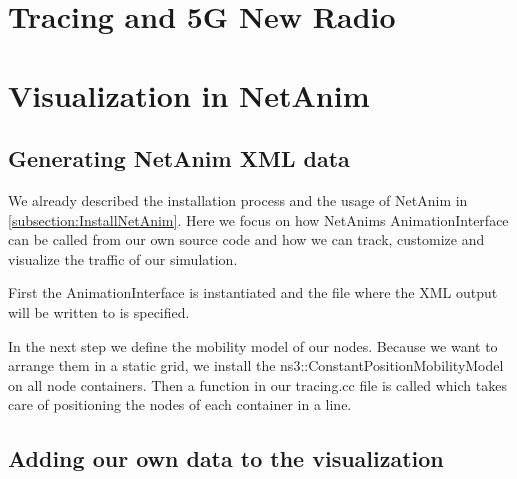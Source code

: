 \section{Tracing and 5G New Radio}
\section{Visualization in NetAnim}
\subsection{Generating NetAnim XML data}
We already described the installation process and the usage of NetAnim in \ref{subsection:InstallNetAnim}. Here we focus on how NetAnims AnimationInterface can be called from our own source code and how we can track, customize and visualize the traffic of our simulation.

First the AnimationInterface is instantiated and the file where the XML output will be written to is specified.

In the next step we define the mobility model of our nodes. Because we want to arrange them in a static grid, we install the ns3::ConstantPositionMobilityModel on all node containers. Then a function in our tracing.cc file is called which takes care of positioning the nodes of each container in a line.
\subsection{Adding our own data to the visualization}








